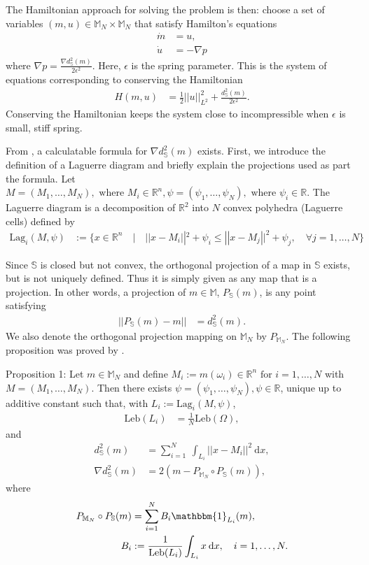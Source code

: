 \documentclass[11pt, oneside]{article}   	%
\newcommand{\R}{\mathbb{R}}
\newcommand{\MN}{\mathbb{M}_N}
\newcommand{\dsmsq}{d^{2}_{\mathbb{S}}(m)}
\newcommand{\graddsmsq}{\nabla{d^{2}_{\mathbb{S}}(m)}}
\newcommand{\M}{\mathbb{M}}
\newcommand{\Sb}{\mathbb{S}}
\newcommand{\Leb}{\mathrm{Leb}}
\begin{document}
The Hamiltonian approach for solving the problem is then: choose a set of variables \((m, u) \in \MN \times \MN \) that satisfy Hamilton's equations
\begin{align} 
\dot{m} &= u, \\
\dot{u} &= - \nabla p
\end{align}
where \(\nabla p = \frac{\graddsmsq}{2\epsilon^2}\). Here, \(\epsilon\) is the spring parameter. This is the system of equations corresponding to conserving the Hamiltonian
\begin{align} 
H(m, u) &= \frac{1}{2} ||u||^2_{L^2} + \frac{\dsmsq}{2\epsilon^2}.
\end{align}
Conserving the Hamiltonian keeps the system close to incompressible when \(\epsilon\) is small,  stiff spring. 

From \cite{gallouet2016lagrangian}, a calculatable formula for \(\graddsmsq\) exists. First, we introduce the definition of a Laguerre diagram and briefly explain the projections used as part the formula. Let \(M = (M_1,\dots,M_N), \text{ where } M_i \in \R^n, \psi = (\psi_1,\dots,\psi_N), \text{ where } \psi_i \in \R\). The Laguerre diagram is a decomposition of \(\R^2\) into \(N\) convex polyhedra (Laguerre cells) defined by
\begin{align}
\mathrm{Lag}_i(M, \psi) &:= \{x \in \R^n \quad | \quad || x - M_i ||^2 + \psi_i \le || x - M_j ||^2 + \psi_j, \quad \forall j = 1,\dots,N\}
\end{align}

Since \(\Sb\) is closed but not convex, the orthogonal projection of a map in \(\Sb\) exists, but is not uniquely defined. Thus it is simply given as any map that is a projection. In other words, a projection of \(m \in \M\), \(P_\Sb(m)\), is any point satisfying
\begin{align}
|| P_\Sb(m) - m || &= \dsmsq.
\end{align}
We also denote the orthogonal projection mapping on \(\MN\) by \(P_{\MN}\). The following proposition was proved by \cite{gallouet2016lagrangian}.

Proposition 1: Let \(m \in \MN\) and define \(M_i := m(\omega_i) \in \R^n \text{ for } i = 1,\dots,N\) with \(M = (M_1,\dots,M_N)\). Then there exists \(\psi = (\psi_1,\dots,\psi_N), \psi \in \R\), unique up to additive constant such that, with \(L_i := \mathrm{Lag}_i(M, \psi)\), 
\begin{align}
\Leb(L_i) &= \frac{1}{N}\Leb(\Omega),
\end{align}
and
\begin{align}
\dsmsq & = \sum_{i=1}^N \: \int_{L_i} || x - M_i ||^2 \: \mathrm{d}x, \\
\graddsmsq &= 2(m - P_{\MN} \circ P_{\mathbb{S}}(m)),
\end{align}
where
\begin{align}
P_{\MN} \circ P_{\mathbb{S}}(m) &= \sum^N_{i=1} B_i \mathbbm{1}_{L_i}(m), \\
B_i &:= \frac{1}{\Leb(L_i)} \int_{L_i} x \: \mathrm{d}x, \quad i = 1,\dots,N. 
\end{align}
\end{document}
